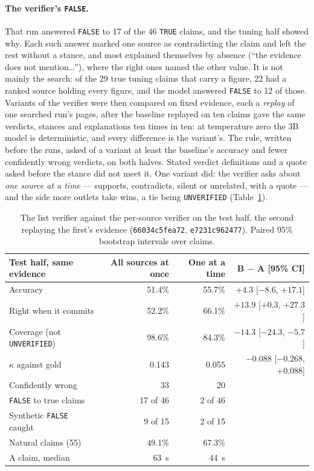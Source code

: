 \paragraph{The verifier's \texttt{FALSE}.} That run answered
\texttt{FALSE} to 17 of the 46 \texttt{TRUE} claims, and the tuning
half showed why. Each such answer marked one source as contradicting the
claim and left the rest without a stance, and most explained themselves
by absence (``the evidence does not mention\ldots''), where the right
ones named the other value. It is not mainly the search: of the 29 true
tuning claims that carry a figure, 22 had a ranked source holding every
figure, and the model answered \texttt{FALSE} to 12 of those. Variants
of the verifier were then compared on fixed evidence, each a
\emph{replay} of one searched run's pages, after the baseline replayed
on ten claims gave the same verdicts, stances and explanations ten times
in ten: at temperature zero the 3B model is deterministic, and every
difference is the variant's. The rule, written before the runs, asked of
a variant at least the baseline's accuracy and fewer confidently wrong
verdicts, on both halves. Stated verdict definitions and a quote asked
before the stance did not meet it. One variant did: the verifier asks
about \emph{one source at a time} --- supports, contradicts, silent or
unrelated, with a quote --- and the side more outlets take wins, a tie
being \texttt{UNVERIFIED} (Table~\ref{tab:per-source}).

\begin{table}[ht]
\centering
\small
\begin{tabular}{@{}lrrr@{}}
\toprule
Test half, same evidence & \textbf{All sources at once} & \textbf{One at a time} & \textbf{B $-$ A [95\% CI]} \\
\midrule
Accuracy                  & 51.4\% & 55.7\% & $+4.3$ [$-8.6$, $+17.1$] \\
Right when it commits     & 52.2\% & 66.1\% & $+13.9$ [$+0.3$, $+27.3$] \\
Coverage (not \texttt{UNVERIFIED}) & 98.6\% & 84.3\% & $-14.3$ [$-24.3$, $-5.7$] \\
$\kappa$ against gold     & 0.143 & 0.055 & $-0.088$ [$-0.268$, $+0.088$] \\
Confidently wrong         & 33 & 20 & \\
\texttt{FALSE} to true claims & 17 of 46 & 2 of 46 & \\
Synthetic \texttt{FALSE} caught & 9 of 15 & 2 of 15 & \\
Natural claims (55)       & 49.1\% & 67.3\% & \\
A claim, median           & 63~s & 44~s & \\
\bottomrule
\end{tabular}
\caption[The verifier, one source at a time]{The list verifier against
the per-source verifier on the test half, the second replaying the
first's evidence (\texttt{66034c5fea72}, \texttt{e7231c962477}). Paired
95\% bootstrap intervals over claims.}
\label{tab:per-source}
\end{table}


